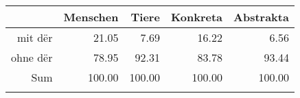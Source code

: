 \begin{tabular}{rrrrr}
  \lsptoprule
 & Menschen & Tiere & Konkreta & Abstrakta \\ 
  \midrule
mit dër & 21.05 & 7.69 & 16.22 & 6.56 \\ 
  ohne dër & 78.95 & 92.31 & 83.78 & 93.44 \\ 
  Sum & 100.00 & 100.00 & 100.00 & 100.00 \\ 
   \lspbottomrule
\end{tabular}
